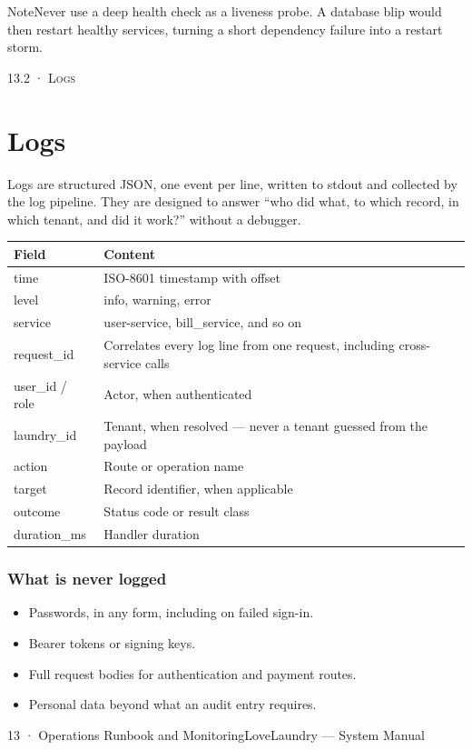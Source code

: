 \documentclass[11pt,a4paper,oneside]{book}
\begin{document}
\begin{notebox}NoteNever use a deep health check as a liveness probe. A database blip would then restart healthy services, turning a short dependency failure into a restart storm.\end{notebox}
\textsc{\small\color{crimson}13.2 · Logs}\par\medskip
\section*{Logs}
Logs are structured JSON, one event per line, written to stdout and collected by the log pipeline. They are designed to answer “who did what, to which record, in which tenant, and did it work?” without a debugger.

\begin{center}\small
\begin{tabularx}{\linewidth}{|X|X|}
\hline
\rowcolor{lightgrey}
\textbf{Field} & \textbf{Content} \\ \hline
time & ISO-8601 timestamp with offset \\ \hline
level & info, warning, error \\ \hline
service & user-service, bill\_service, and so on \\ \hline
request\_id & Correlates every log line from one request, including cross-service calls \\ \hline
user\_id / role & Actor, when authenticated \\ \hline
laundry\_id & Tenant, when resolved — never a tenant guessed from the payload \\ \hline
action & Route or operation name \\ \hline
target & Record identifier, when applicable \\ \hline
outcome & Status code or result class \\ \hline
duration\_ms & Handler duration \\ \hline
\end{tabularx}
\end{center}
\subsubsection*{What is never logged}
\begin{itemize}
\item Passwords, in any form, including on failed sign-in.
\item Bearer tokens or signing keys.
\item Full request bodies for authentication and payment routes.
\item Personal data beyond what an audit entry requires.
\end{itemize}
13 · Operations Runbook and MonitoringLoveLaundry — System Manual
\end{document}
